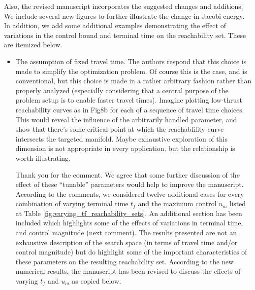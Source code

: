 \documentclass[11pt]{article}
\begin{document}
Also, the revised manuscript incorporates the suggested changes and additions.
We include several new figures to further illustrate the change in Jacobi energy.
In addition, we add some additional examples demonstrating the effect of variations in the control bound and terminal time on the reachability set.
These are itemized below. 

\begin{itemize}
    \item 
        \begin{itshape}
            The assumption of fixed travel time.  The authors respond that this choice is made to simplify the optimization problem.  Of course this is the case, and is conventional, but this choice is made in a rather arbitrary fashion rather than properly analyzed (especially considering that a central purpose of the problem setup is to enable faster travel times).  Imagine plotting low-thrust reachability curves as in Fig8b for each of a sequence of travel time choices.  This would reveal the influence of the arbitrarily handled parameter, and show that there's some critical point at which the reachablility curve intersects the targeted manifold.  Maybe exhaustive exploration of this dimension is not appropriate in every application, but the relationship is worth illustrating.
        \end{itshape}

        Thank you for the comment. 
        We agree that some further discussion of the effect of these ``tunable'' parameters would help to improve the manuscript. 
		According to the comments, we considered twelve additional cases for every combination of varying terminal time $t_f$ and the maximum control $u_m$ listed at Table \ref{fig:varying_tf_reachability_sets}. 
        An additional section has been included which highlights some of the effects of variations in terminal time, and control magnitude (next comment).
        The results presented are not an exhaustive description of the search space (in terms of travel time and/or control magnitude) but do highlight some of the important characteristics of these parameters on the resulting reachability set.
		According to the new numerical results, the manuscript has been revised to discuss the effects of varying $t_f$ and $u_m$ as copied below. 
        

\end{itemize}
\end{document}
